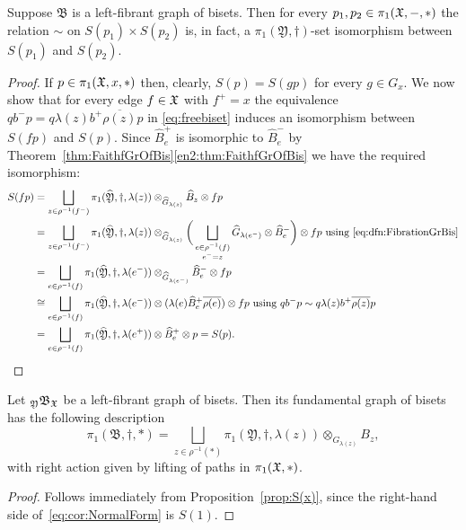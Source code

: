 \documentclass{amsart}
\begin{document}
\begin{prop}\label{prop:S(x)}
  Suppose $\mathfrak B$ is a left-fibrant graph of bisets. Then for every $p_1,p_2\in
  \pi_1({\mathfrak X}, -, *)$ the relation $\sim$ on $S(p_1)\times S(p_2)$ is, in
  fact, a $\pi_1(\mathfrak Y,\dagger)$-set isomorphism between $S(p_1)$ and
  $S(p_2)$.
\end{prop}
\begin{proof}
  If $p\in\pi_1({\mathfrak X},x,*)$ then, clearly, $S(p)=S(g p)$ for every $g\in
  G_x$. We now show that for every edge $f\in{\mathfrak X}$ with $f^+=x$ the
  equivalence $q b^-p = q\lambda(z)b^+\overline{\rho(z)}p$ in
  \eqref{eq:freebiset} induces an isomorphism between $S(f p)$ and
  $S(p)$. Since $\widehat B^+_e$ is isomorphic to $\widehat B^-_e$ by
  Theorem~\ref{thm:FaithfGrOfBis}\eqref{en2:thm:FaithfGrOfBis} we have the
  required isomorphism:
\begin{align*}
  S(f p) &= \bigsqcup_{z\in \rho^{-1}(f^-)}\pi_1(\widehat{\mathfrak
    Y},\dagger,\lambda(z))\otimes_{\widehat G_{\lambda(z)}}\widehat B_z\otimes f p\\
  &= \bigsqcup_{z\in \rho^{-1}(f^-)}\pi_1(\widehat{\mathfrak Y},\dagger,\lambda(z))
  \otimes_{\widehat G_{\lambda(z)}}\bigg(\bigsqcup_{\substack{e\in \rho^{-1}(f)\\e^-=z}}
  \widehat G_{\lambda(e^-)} \otimes \widehat B^-_e \bigg) \otimes f p\text{
    using }\eqref{eq:dfn:FibrationGrBis}\\
  &= \bigsqcup_{e\in \rho^{-1}(f)}\pi_1(\widehat{\mathfrak Y},\dagger,\lambda(e^-))
  \otimes_{\widehat G_{\lambda(e^-)}}\widehat B^-_e\otimes f p\\
  &\cong \bigsqcup_{e\in \rho^{-1}(f)}\pi_1(\widehat{\mathfrak
    Y},\dagger,\lambda(e^-))\otimes  (\lambda(e) \widehat B^+_e
  \overline{\rho(e)})\otimes f p\text{ using }q b^-p \sim q\lambda(z)b^+\overline{\rho(z)}p\\
  &=\bigsqcup_{e\in \rho^{-1}(f)}\pi_1(\widehat{\mathfrak Y},\dagger,\lambda(e^+))\otimes \widehat B^+_e\otimes p =S(p).\qedhere
\end{align*}  
\end{proof}

\begin{cor}\label{cor:NormalForm}
  Let ${}_{\mathfrak Y}\mathfrak B_{\mathfrak X}$ be a left-fibrant graph of
  bisets. Then its fundamental graph of bisets has the following
  description
  \begin{equation}
  \label{eq:cor:NormalForm}
    \pi_1(\mathfrak B,\dagger,*)=\bigsqcup_{z\in \rho^{-1}(*)}\pi_1(\mathfrak Y,\dagger,\lambda(z))\otimes_{G_{\lambda(z)}}B_z,
\end{equation}
 with right action given by lifting of paths in $\pi_1({\mathfrak X},*)$. 
\end{cor}
\begin{proof}
  Follows immediately from Proposition~\ref{prop:S(x)}, since the
  right-hand side of~\eqref{eq:cor:NormalForm} is $S(1)$.
\end{proof}
\end{document}
